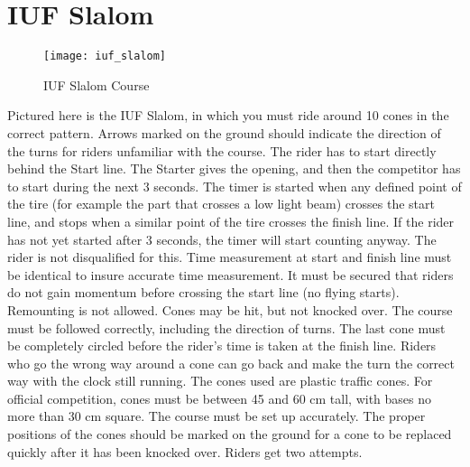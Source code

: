 \section{IUF Slalom}

\begin{figure}[h]
\begin{center}
\texttt{[image: iuf\_slalom]}
\end{center}
\vspace{-20pt}
\caption{IUF Slalom Course \label{fig:iuf_slalom}}
\vspace{-10pt}
\end{figure}
Pictured here is the IUF Slalom, in which you must ride around 10 cones in the correct pattern.
Arrows marked on the ground should indicate the direction of the turns for riders unfamiliar with the course.
The rider has to start directly behind the Start line.
The Starter gives the opening, and then the competitor has to start during the next 3 seconds.
The timer is started when any defined point of the tire (for example the part that crosses a low light beam) crosses the start line, and stops when a similar point of the tire crosses the finish line.
If the rider has not yet started after 3 seconds, the timer will start counting anyway.
The rider is not disqualified for this.
Time measurement at start and finish line must be identical to insure accurate time measurement.
It must be secured that riders do not gain momentum before crossing the start line (no flying starts).
Remounting is not allowed.
Cones may be hit, but not knocked over.
The course must be followed correctly, including the direction of turns.
The last cone must be completely circled before the rider's time is taken at the finish line.
Riders who go the wrong way around a cone can go back and make the turn the correct way with the clock still running.
The cones used are plastic traffic cones.
For official competition, cones must be between 45 and 60 cm tall, with bases no more than 30 cm square.
The course must be set up accurately.
The proper positions of the cones should be marked on the ground for a cone to be replaced quickly after it has been knocked over.
Riders get two attempts.
